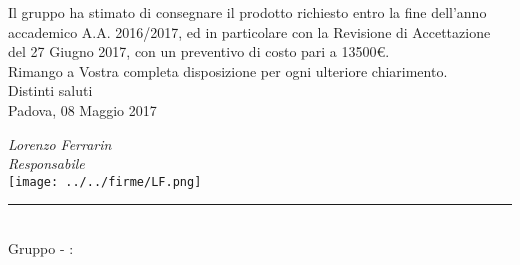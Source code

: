 \begin{titlepage}
	\begin{large}
	Il gruppo \GroupName{} ha stimato di consegnare il prodotto richiesto entro la fine dell'anno accademico A.A. 2016/2017, ed in particolare con la Revisione di Accettazione del 27 Giugno 2017, con un preventivo di costo pari a 13500€.\\
	
	Rimango a Vostra completa disposizione per ogni ulteriore chiarimento. \\
	Distinti saluti\\
	 
	Padova, 08 Maggio 2017
	\begin{flushright}
		\emph{Lorenzo Ferrarin} \\ 
		\emph{Responsabile \GroupName{}} \\
		\texttt{[image: ../../firme/LF.png]}
 	\end{flushright}
	
	\end{large}
	
	\vspace{1cm} 
	\begin{center}
		\rule{13cm}{0,03cm} \\
		Gruppo \GroupName{} - \email: \GroupEmail{}
	\end{center} 
	
	\vspace{0.2cm}
	
\end{titlepage}
  
 \restoregeometry
